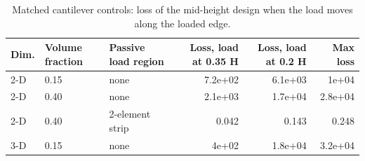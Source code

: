 \begin{table}[t]
\centering\small
\caption{Matched cantilever controls: loss of the mid-height design when the load moves along the loaded edge.}
\label{tab:tab_matched}
\begin{tabular}{lllrrr}
\toprule
Dim. & Volume fraction & Passive load region & Loss, load at 0.35 H & Loss, load at 0.2 H & Max loss \\
\midrule
2-D & 0.15 & none & 7.2e+02 & 6.1e+03 & 1e+04 \\
2-D & 0.40 & none & 2.1e+03 & 1.7e+04 & 2.8e+04 \\
2-D & 0.40 & 2-element strip & 0.042 & 0.143 & 0.248 \\
3-D & 0.15 & none & 4e+02 & 1.8e+04 & 3.2e+04 \\
\bottomrule
\end{tabular}
\end{table}
